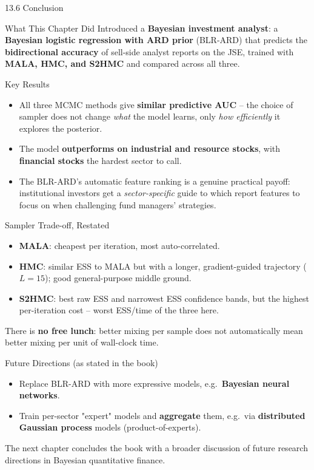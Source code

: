 \documentclass[aspectratio=169,10pt]{beamer}
\begin{document}
\begin{frame}[allowframebreaks]{13.6 \; Conclusion}

\begin{block}{What This Chapter Did}
Introduced a \textbf{Bayesian investment analyst}: a \textbf{Bayesian
logistic regression with ARD prior} (BLR-ARD) that predicts the
\textbf{bidirectional accuracy} of sell-side analyst reports on the JSE,
trained with \textbf{MALA, HMC, and S2HMC} and compared across all three.
\end{block}

\begin{block}{Key Results}
\begin{itemize}
  \item All three MCMC methods give \textbf{similar predictive AUC} --
        the choice of sampler does not change \emph{what} the model learns,
        only \emph{how efficiently} it explores the posterior.
  \item The model \textbf{outperforms on industrial and resource stocks},
        with \textbf{financial stocks} the hardest sector to call.
  \item The BLR-ARD's automatic feature ranking is a genuine practical
        payoff: institutional investors get a \emph{sector-specific} guide
        to which report features to focus on when challenging fund
        managers' strategies.
\end{itemize}
\end{block}

\framebreak

\begin{block}{Sampler Trade-off, Restated}
\begin{itemize}
  \item \textbf{MALA}: cheapest per iteration, most auto-correlated.
  \item \textbf{HMC}: similar ESS to MALA but with a longer, gradient-guided
        trajectory ($L=15$); good general-purpose middle ground.
  \item \textbf{S2HMC}: best raw ESS and narrowest ESS confidence bands, but
        the highest per-iteration cost -- worst ESS/time of the three here.
\end{itemize}
There is \textbf{no free lunch}: better mixing per sample does not
automatically mean better mixing per unit of wall-clock time.
\end{block}

\begin{alertblock}{Future Directions (as stated in the book)}
\begin{itemize}
  \item Replace BLR-ARD with more expressive models, e.g.\ \textbf{Bayesian
        neural networks}.
  \item Train per-sector "expert" models and \textbf{aggregate} them, e.g.\
        via \textbf{distributed Gaussian process} models (product-of-experts).
\end{itemize}
The next chapter concludes the book with a broader discussion of future
research directions in Bayesian quantitative finance.
\end{alertblock}

\end{frame}
\end{document}
